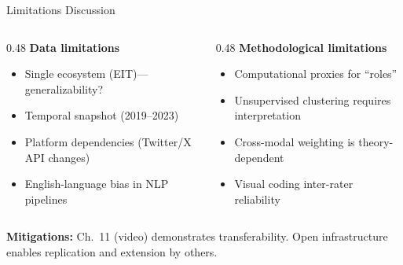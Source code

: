 \documentclass[aspectratio=169]{beamer}
\newcommand{\secmark}[1]{\hfill{\scriptsize\color{gray}#1}}
\begin{document}
\begin{frame}{Limitations}
\secmark{Discussion}
\begin{columns}[T]
\begin{column}{0.48\textwidth}
    \textbf{Data limitations}
    \begin{itemize}
        \item Single ecosystem (EIT)---generalizability?
        \item Temporal snapshot (2019--2023)
        \item Platform dependencies (Twitter/X API changes)
        \item English-language bias in NLP pipelines
    \end{itemize}
\end{column}
\begin{column}{0.48\textwidth}
    \textbf{Methodological limitations}
    \begin{itemize}
        \item Computational proxies for ``roles''
        \item Unsupervised clustering requires interpretation
        \item Cross-modal weighting is theory-dependent
        \item Visual coding inter-rater reliability
    \end{itemize}
\end{column}
\end{columns}
\vspace{0.8em}
\textbf{Mitigations:} {\small Ch.~11 (video) demonstrates transferability. Open infrastructure enables replication and extension by others.}
\end{frame}
\end{document}
